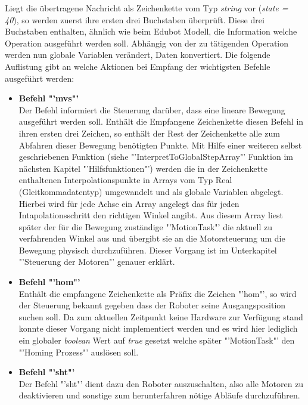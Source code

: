 Liegt die übertragene Nachricht als Zeichenkette vom Typ \textit{string} vor (\textit{state = 40}), so werden zuerst ihre ersten drei Buchstaben überprüft. Diese drei Buchstaben enthalten, ähnlich wie beim Edubot Modell, die Information welche Operation ausgeführt werden soll. 
Abhängig von der zu tätigenden Operation werden nun globale Variablen verändert, Daten konvertiert. Die folgende Auflistung gibt an welche Aktionen bei Empfang der wichtigsten Befehle ausgeführt werden:

\begin{itemize}
\item \textbf{Befehl "'mvs"'}\\
Der Befehl informiert die Steuerung darüber, dass eine lineare Bewegung ausgeführt werden soll. Enthält die Empfangene Zeichenkette diesen Befehl in ihren ersten drei Zeichen, so enthält der Rest der Zeichenkette alle zum Abfahren dieser Bewegung benötigten Punkte.
Mit Hilfe einer weiteren selbst geschriebenen Funktion (siehe "'InterpretToGlobalStepArray"' Funktion im nächsten Kapitel "'Hilfsfunktionen"') werden die in der Zeichenkette enthaltenen Interpolationspunkte in Arrays vom Typ Real (Gleitkommadatentyp) umgewandelt und als globale Variablen abgelegt. Hierbei wird für jede Achse ein Array angelegt das für jeden Intapolationsschritt den richtigen Winkel angibt. Aus diesem Array liest später der für die Bewegung zuständige "'MotionTask"' die aktuell zu verfahrenden Winkel aus und übergibt sie an die Motorsteuerung um die Bewegung physisch durchzuführen. Dieser Vorgang ist im Unterkapitel "'Steuerung der Motoren"' genauer erklärt.
\item \textbf{Befehl "'hom"'}\\
Enthält die empfangene Zeichenkette als Präfix die Zeichen "'hom"', so wird der Steuerung bekannt gegeben dass der Roboter seine Ausgangsposition suchen soll. Da zum aktuellen Zeitpunkt keine Hardware zur Verfügung stand konnte dieser Vorgang nicht implementiert werden und es wird hier lediglich ein globaler \textit{boolean} Wert auf \textit{true} gesetzt welche später "'MotionTask"' den "'Homing Prozess"' auslösen soll.
\item \textbf{Befehl "'sht"'}\\
Der Befehl "'sht"' dient dazu den Roboter auszuschalten, also alle Motoren zu deaktivieren und sonstige zum herunterfahren nötige Abläufe durchzuführen. 
\end{itemize}
